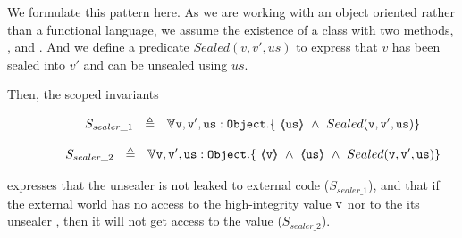 We formulate this pattern here. 
As we are working with an object oriented rather than a functional language, we assume the existence of a class 
 with two methods, , and . 
And we define a predicate $Sealed(v,v',us)$ to express that $v$ has been sealed into $v'$ and can be unsealed using $us$.

Then, the scoped invariants 

 $$\strut \SPSP  S_{sealer\_1}\ \  \triangleq \ \ \TwoStatesN{ \prg{v},\prg{v}',\prg{us}: \prg{Object} }
 {\   \inside{\prg{us}} \ \wedge\ Sealed(\prg{v},\prg{v}',\prg{us}) }$$  
 
 $$\strut \SPSP  S_{sealer\_2}\ \  \triangleq \ \ \TwoStatesN{ \prg{v},\prg{v}',\prg{us}: \prg{Object} }
 {\ \inside{\prg{v}} \ \wedge \ \inside{\prg{us}} \ \wedge\ Sealed(\prg{v},\prg{v}',\prg{us}) }$$  

\noindent
 expresses that the unsealer is not leaked to external code ($S_{sealer\_1}$), and that if the external world has no access to the high-integrity value $\mbox{\normalfont{\texttt{v}}}$ nor to the its unsealer  , then it will not get access to the value  ($S_{sealer\_2}$). 

%
%
%
% 
%
%





%
